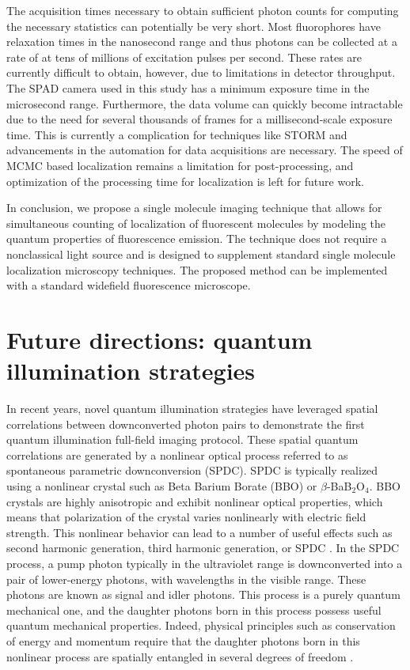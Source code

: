 The acquisition times necessary to obtain sufficient photon counts for computing the necessary statistics can potentially be very short. Most fluorophores have relaxation times in the nanosecond range and thus photons can be collected at a rate of at tens of millions of excitation pulses per second. These rates are currently difficult to obtain, however, due to limitations in detector throughput. The SPAD camera used in this study has a minimum exposure time in the microsecond range. Furthermore, the data volume can quickly become intractable due to the need for several thousands of frames for a millisecond-scale exposure time. This is currently a complication for techniques like STORM and advancements in the automation for data acquisitions are necessary. The speed of MCMC based localization remains a limitation for post-processing, and optimization of the processing time for localization is left for future work. 

In conclusion, we propose a single molecule imaging technique that allows for simultaneous counting of localization of fluorescent molecules by modeling the quantum properties of fluorescence emission. The technique does not require a nonclassical light source and is designed to supplement standard single molecule localization microscopy techniques. The proposed method can be implemented with a standard widefield fluorescence microscope.

\section{Future directions: quantum illumination strategies}

In recent years, novel quantum illumination strategies have leveraged spatial correlations between downconverted photon pairs to demonstrate the first quantum illumination full-field imaging protocol. These spatial quantum correlations are generated by a nonlinear optical process referred to as spontaneous parametric downconversion (SPDC). SPDC is typically realized using a nonlinear crystal such as Beta Barium Borate (BBO) or $\beta$-BaB$_2$O$_4$. BBO crystals are highly anisotropic and exhibit nonlinear optical properties, which means that polarization of the crystal varies nonlinearly with electric field strength. This nonlinear behavior can lead to a number of useful effects such as second harmonic generation, third harmonic generation, or SPDC \parencite{Boyd2020}. In the SPDC process, a pump photon typically in the ultraviolet range is downconverted into a pair of lower-energy photons, with wavelengths in the visible range. These photons are known as signal and idler photons. This process is a purely quantum mechanical one, and the daughter photons born in this process possess useful quantum mechanical properties. Indeed, physical principles such as conservation of energy and momentum require that the daughter photons born in this nonlinear process are spatially entangled in several degrees of freedom \parencite{Boyd2020}. 


